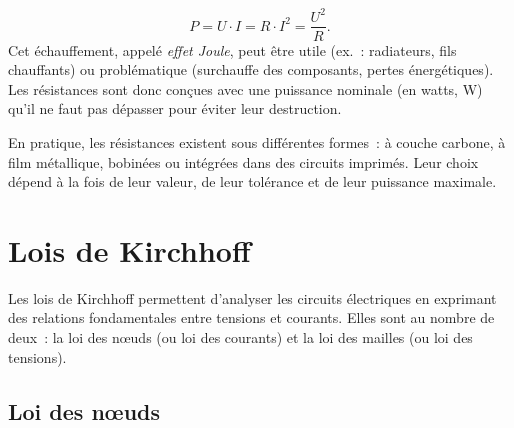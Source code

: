 \[
P = U \cdot I = R \cdot I^2 = \frac{U^2}{R}.
\]
Cet \'echauffement, appel\'e \emph{effet Joule}, peut \^etre utile (ex.~: radiateurs, fils chauffants) ou probl\'ematique (surchauffe des composants, pertes \'energ\'etiques). Les r\'esistances sont donc conçues avec une puissance nominale (en watts, \unit{\watt}) qu'il ne faut pas d\'epasser pour \'eviter leur destruction.\par
En pratique, les r\'esistances existent sous diff\'erentes formes~: à couche carbone, à film m\'etallique, bobin\'ees ou int\'egr\'ees dans des circuits imprim\'es. Leur choix d\'epend à la fois de leur valeur, de leur tol\'erance et de leur puissance maximale.

\section{Lois de Kirchhoff} \label{subsec:kirchhoff}
Les lois de Kirchhoff permettent d'analyser les circuits \'electriques en exprimant des relations fondamentales entre tensions et courants. Elles sont au nombre de deux~: la loi des nœuds (ou loi des courants) et la loi des mailles (ou loi des tensions).
\subsection{Loi des n{\oe}uds} \label{subsec:noeuds}
\begin{figure}[H]
    \centering
\end{figure}

